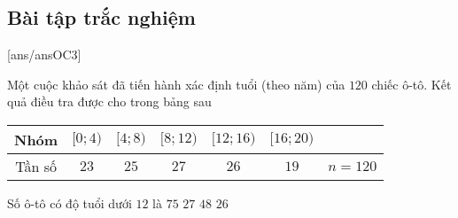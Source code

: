 \subsection{Bài tập trắc nghiệm}
[ans/ansOC3]
\begin{ex}%
	Một cuộc khảo sát đã tiến hành xác định tuổi (theo năm) của $120$ chiếc ô-tô. Kết quả điều tra được cho trong bảng sau
	\begin{center}
		\begin{tabular}{ |c|c|c|c|c|c|c| }
			\hline
			Nhóm & $[0;4)$ & $[4;8)$ & $[8;12)$ & $[12;16)$ & $[16;20)$ &  \\
			\hline
			Tần số & $23$ & $25$ & $27$ & $26$ & $19$ & $n=120$ \\
			\hline
		\end{tabular}
	\end{center}
	Số ô-tô có độ tuổi dưới $12$ là
	\choice
	{\True $75$}
	{$27$}
	{$48$}
	{$26$}
\end{ex}
